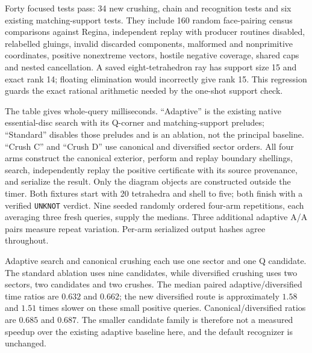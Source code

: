 Forty focused tests pass: 34 new crushing, chain and recognition tests and
six existing matching-support tests.  They include 160 random face-pairing
census comparisons against Regina, independent replay with producer
routines disabled, relabelled gluings, invalid discarded components,
malformed and nonprimitive coordinates, positive nonextreme vectors,
hostile negative coverage, shared caps and nested cancellation.  A saved
eight-tetrahedron ray has support size 15 and exact rank 14; floating
elimination would incorrectly give rank 15.  This regression guards the
exact rational arithmetic needed by the one-shot support check.

\begin{center}
\small

\end{center}

The table gives whole-query milliseconds.  ``Adaptive'' is the existing
native essential-disc search with its Q-corner and matching-support
preludes; ``Standard'' disables those preludes and is an ablation, not the
principal baseline.  ``Crush C'' and ``Crush D'' use canonical and diversified
sector orders.  All four arms construct the canonical exterior, perform
and replay boundary shellings, search, independently replay the positive
certificate with its source provenance, and serialize the result.  Only
the diagram objects are constructed outside the timer.  Both fixtures
start with 20 tetrahedra and shell to five; both finish with a verified
\texttt{UNKNOT} verdict.  Nine seeded randomly ordered four-arm repetitions,
each averaging three fresh queries, supply the medians.  Three additional
adaptive A/A pairs measure repeat variation.  Per-arm serialized output
hashes agree throughout.

Adaptive search and canonical crushing each use one sector and one Q
candidate.  The standard ablation uses nine candidates, while diversified
crushing uses two sectors, two candidates and two crushes.  The median
paired adaptive/diversified time ratios are $0.632$ and $0.662$; the new
diversified route is approximately $1.58$ and $1.51$ times slower on these
small positive queries.  Canonical/diversified ratios are $0.685$ and
$0.687$.  The smaller candidate family is therefore not a measured speedup
over the existing adaptive baseline here, and the default recognizer is
unchanged.

